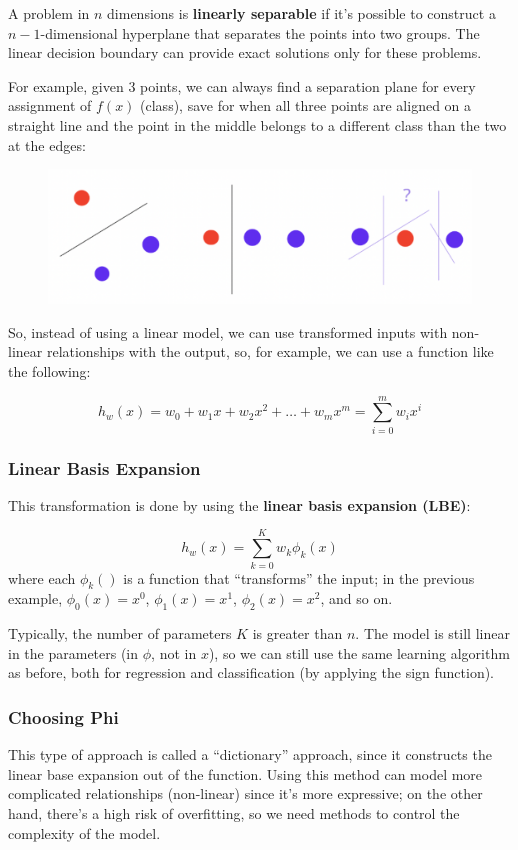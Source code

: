 A problem in $n$ dimensions is \textbf{linearly separable} if it's possible to construct a $n-1$-dimensional hyperplane that separates the points into two groups. The linear decision boundary can provide exact solutions only for these problems.

For example, given 3 points, we can always find a separation plane for every assignment of $f(x)$ (class), save for when all three points are aligned on a straight line and the point in the middle belongs to a different class than the two at the edges:

\begin{figure}[h]
    \centering
    \includegraphics[width=0.6\linewidth]{img/linearly separable.png}
\end{figure}

So, instead of using a linear model, we can use transformed inputs with non-linear relationships with the output, so, for example, we can use a function like the following:

\begin{equation*}
    h_w(x) = w_0 + w_1x + w_2x^2 + \dots + w_mx^m = \sum_{i=0}^m w_ix^i
\end{equation*}

\subsubsection*{Linear Basis Expansion}

This transformation is done by using the \textbf{linear basis expansion (LBE)}:

\begin{equation*}
    h_w(x) = \sum_{k=0}^K w_k\phi_k(x)
\end{equation*}
where each $\phi_k()$ is a function that ``transforms'' the input; in the previous example, $\phi_0(x)= x^0$, $\phi_1(x)= x^1$, $\phi_2(x)= x^2$, and so on.

Typically, the number of parameters $K$ is greater than $n$.
The model is still linear in the parameters (in $\phi$, not in $x$), so we can still use the same learning algorithm as before, both for regression and classification (by applying the sign function).

\subsubsection{Choosing Phi}
This type of approach is called a ``dictionary'' approach, since it constructs the linear base expansion out of the function. Using this method can model more complicated relationships (non-linear) since it's more expressive; on the other hand, there's a high risk of overfitting, so we need methods to control the complexity of the model.

